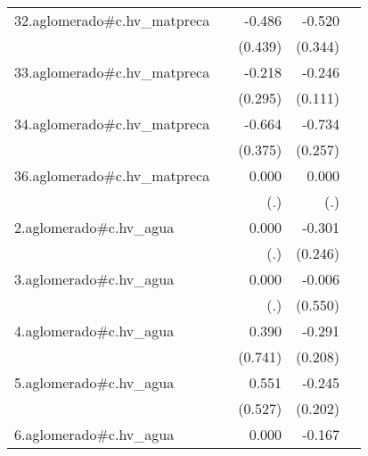 {\begin{longtable}{l*{4}{D{.}{.}{-1}}}
\addlinespace
32.aglomerado#c.hv\_matpreca&                     &      -0.486         &      -0.520         &                     \\
            &                     &     (0.439)         &     (0.344)         &                     \\
\addlinespace
33.aglomerado#c.hv\_matpreca&                     &      -0.218         &      -0.246\sym{*}  &                     \\
            &                     &     (0.295)         &     (0.111)         &                     \\
\addlinespace
34.aglomerado#c.hv\_matpreca&                     &      -0.664         &      -0.734\sym{**} &                     \\
            &                     &     (0.375)         &     (0.257)         &                     \\
\addlinespace
36.aglomerado#c.hv\_matpreca&                     &       0.000         &       0.000         &                     \\
            &                     &         (.)         &         (.)         &                     \\
\addlinespace
2.aglomerado#c.hv\_agua&                     &       0.000         &      -0.301         &                     \\
            &                     &         (.)         &     (0.246)         &                     \\
\addlinespace
3.aglomerado#c.hv\_agua&                     &       0.000         &      -0.006         &                     \\
            &                     &         (.)         &     (0.550)         &                     \\
\addlinespace
4.aglomerado#c.hv\_agua&                     &       0.390         &      -0.291         &                     \\
            &                     &     (0.741)         &     (0.208)         &                     \\
\addlinespace
5.aglomerado#c.hv\_agua&                     &       0.551         &      -0.245         &                     \\
            &                     &     (0.527)         &     (0.202)         &                     \\
\addlinespace
6.aglomerado#c.hv\_agua&                     &       0.000         &      -0.167         &                     \\

\end{longtable}}
